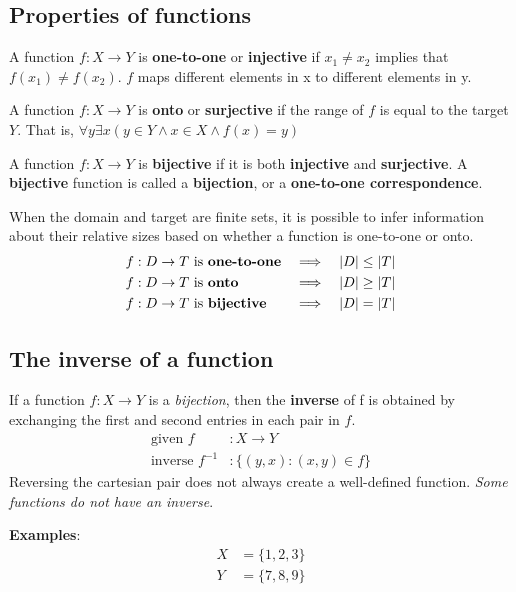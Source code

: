 \subsection{Properties of functions}

A function $f: X \rightarrow Y$ is \textbf{one-to-one} or \textbf{injective} if $x_1 \not = x_2$ implies that $f(x_1) \not = f(x_2)$.
$f$ maps different elements in x to different elements in y.

A function $f: X \rightarrow Y$ is \textbf{onto} or \textbf{surjective} if the range of $f$ is equal to the target $Y$.
That is, $\forall y \exists x (y \in Y \land x \in X \land f(x) = y)$

A function $f: X \rightarrow Y$ is \textbf{bijective} if it is both \textbf{injective} and \textbf{surjective}.
A \textbf{bijective} function is called a \textbf{bijection}, or a \textbf{one-to-one correspondence}.

When the domain and target are finite sets, it is possible to infer information about their relative sizes
based on whether a function is one-to-one or onto.
\begin{align*}
  f: D \rightarrow T & \text{ is \textbf{one-to-one}} & \implies &  & \left\lvert D\right\rvert & \leq \left\lvert T\right\rvert \\
  f: D \rightarrow T & \text{ is \textbf{onto}}       & \implies &  & \left\lvert D\right\rvert & \geq \left\lvert T\right\rvert \\
  f: D \rightarrow T & \text{ is \textbf{bijective}}  & \implies &  & \left\lvert D\right\rvert & = \left\lvert T\right\rvert
\end{align*}

\subsection{The inverse of a function}

If a function $f: X \rightarrow Y$ is a \textit{bijection},
then the \textbf{inverse} of f is obtained by exchanging the first and second entries in each pair in $f$.
\begin{align*}
  \text{given } f        & : X \rightarrow Y           \\
  \text{inverse } f^{-1} & : \{(y, x) : (x, y) \in f\}
\end{align*}
Reversing the cartesian pair does not always create a well-defined function.
\textit{Some functions do not have an inverse}.

\textbf{Examples}:
\begin{align*}
  X & = \{1, 2, 3\} \\
  Y & = \{7, 8, 9\}
\end{align*}

